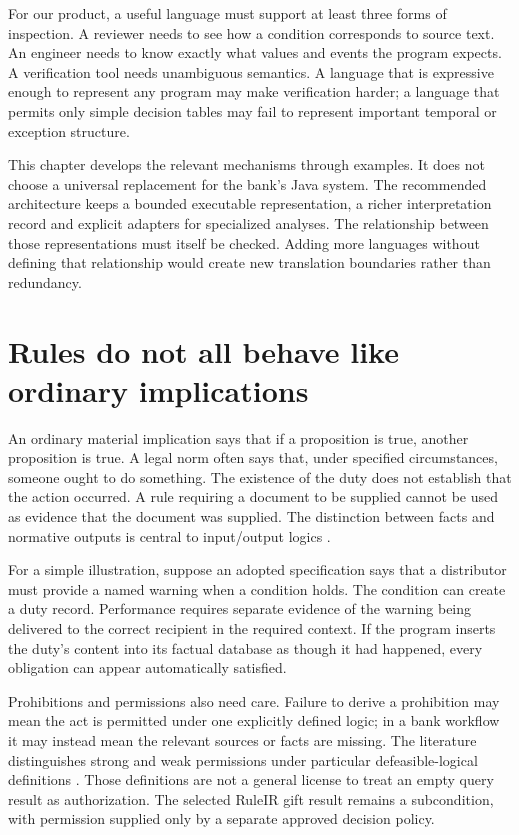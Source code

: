 \documentclass[12pt,a4paper,oneside,openany]{book}
\begin{document}
For our product, a useful language must support at least three forms of
inspection. A reviewer needs to see how a condition corresponds to source
text. An engineer needs to know exactly what values and events the program
expects. A verification tool needs unambiguous semantics. A language that is
expressive enough to represent any program may make verification harder; a
language that permits only simple decision tables may fail to represent
important temporal or exception structure.

This chapter develops the relevant mechanisms through examples. It does not
choose a universal replacement for the bank's Java system. The recommended
architecture keeps a bounded executable representation, a richer interpretation
record and explicit adapters for specialized analyses. The relationship between
those representations must itself be checked. Adding more languages without
defining that relationship would create new translation boundaries rather than
redundancy.

\section{Rules do not all behave like ordinary implications}
\label{sec:languages-norms}
An ordinary material implication says that if a proposition is true, another
proposition is true. A legal norm often says that, under specified circumstances,
someone ought to do something. The existence of the duty does not establish
that the action occurred. A rule requiring a document to be supplied cannot
be used as evidence that the document was supplied. The distinction between
facts and normative outputs is central to input/output logics
\citep[secs.~2--4]{inputoutput2000}.

For a simple illustration, suppose an adopted specification says that a
distributor must provide a named warning when a condition holds. The condition
can create a duty record. Performance requires separate evidence of the
warning being delivered to the correct recipient in the required context.
If the program inserts the duty's content into its factual database as though
it had happened, every obligation can appear automatically satisfied.

Prohibitions and permissions also need care. Failure to derive a prohibition
may mean the act is permitted under one explicitly defined logic; in a bank
workflow it may instead mean the relevant sources or facts are missing. The
literature distinguishes strong and weak permissions under particular
defeasible-logical definitions \citep[secs.~2--4]{permissions2012}. Those
definitions are not a general license to treat an empty query result as
authorization. The selected RuleIR gift result remains a subcondition, with
permission supplied only by a separate approved decision policy.
\end{document}

